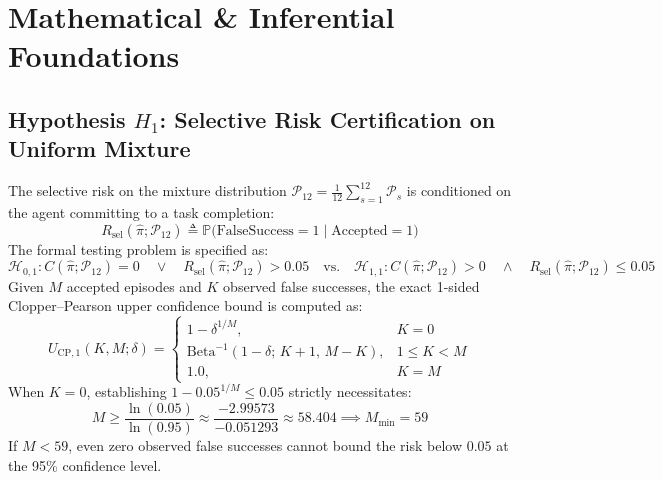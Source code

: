 \documentclass[10pt,a4paper]{article}
\begin{document}
\section{Mathematical \& Inferential Foundations}

\subsection{Hypothesis $H_1$: Selective Risk Certification on Uniform Mixture}
The selective risk on the mixture distribution $\mathcal{P}_{12} = \frac{1}{12}\sum_{s=1}^{12}\mathcal{P}_s$ is conditioned on the agent committing to a task completion:
\begin{equation}
R_{\mathrm{sel}}(\hat{\pi}; \mathcal{P}_{12}) \triangleq \mathbb{P}\big(\mathrm{FalseSuccess} = 1 \;\big|\; \mathrm{Accepted} = 1\big)
\end{equation}
The formal testing problem is specified as:
\begin{equation}
\mathcal{H}_{0,1}: C(\hat{\pi}; \mathcal{P}_{12}) = 0 \quad\lor\quad R_{\mathrm{sel}}(\hat{\pi}; \mathcal{P}_{12}) > 0.05 \quad\text{vs.}\quad \mathcal{H}_{1,1}: C(\hat{\pi}; \mathcal{P}_{12}) > 0 \quad\land\quad R_{\mathrm{sel}}(\hat{\pi}; \mathcal{P}_{12}) \le 0.05
\end{equation}
Given $M$ accepted episodes and $K$ observed false successes, the exact 1-sided Clopper--Pearson upper confidence bound is computed as:
\begin{equation}
U_{\mathrm{CP},1}(K, M; \delta) = \begin{cases} 
1 - \delta^{1/M}, & K = 0 \\ 
\mathrm{Beta}^{-1}(1 - \delta;\, K + 1,\, M - K), & 1 \le K < M \\ 
1.0, & K = M 
\end{cases}
\end{equation}
When $K=0$, establishing $1 - 0.05^{1/M} \le 0.05$ strictly necessitates:
\begin{equation}
M \ge \frac{\ln(0.05)}{\ln(0.95)} \approx \frac{-2.99573}{-0.051293} \approx 58.404 \implies M_{\min} = 59
\end{equation}
If $M < 59$, even zero observed false successes cannot bound the risk below $0.05$ at the 95\% confidence level.
\end{document}
